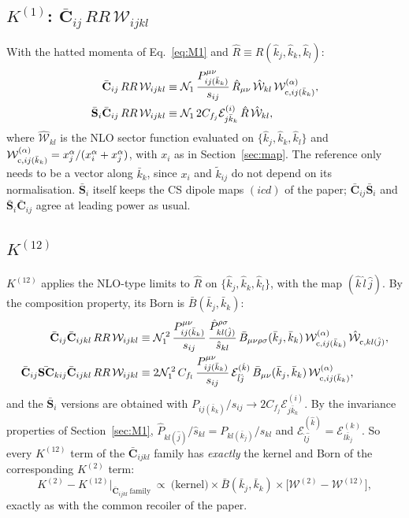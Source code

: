 \documentclass[11pt,a4paper]{article}
\newcommand{\bbC}[1]{\bar{\mathbf C}_{#1}}
\newcommand{\bbS}[1]{\bar{\mathbf S}_{#1}}
\newcommand{\bbSC}[1]{\bar{\mathbf{SC}}_{#1}}
\newcommand{\RR}{RR}
\newcommand{\W}[1]{\mathcal W_{#1}}
\newcommand{\jb}{\bar k_{j}}
\newcommand{\kb}{\bar k_{k}}
\newcommand{\jh}{\hat k_{j}}
\newcommand{\kh}{\hat k_{k}}
\newcommand{\lh}{\hat k_{l}}
\newcommand{\E}[3]{\mathcal E^{(#1)}_{#2#3}}
\newcommand{\Norms}{\mathcal N_1^{\,2}}
\begin{document}
\subsection{$K^{(1)}$: $\bbC{ij}\,\RR\,\W{ijkl}$}
With the hatted momenta of Eq.~\eqref{eq:M1} and $\hat R\equiv R(\jh,\kh,\lh)$:
\begin{align}
\bbC{ij}\,\RR\,\W{ijkl}&\equiv
\mathcal N_1\,\frac{P^{\mu\nu}_{ij(\kb)}}{s_{ij}}\,\hat R_{\mu\nu}\,
\hat{\mathcal W}_{kl}\,\W{{\rm c},ij(\kb)}^{(\alpha)},
\\
\bbS{i}\bbC{ij}\,\RR\,\W{ijkl}&\equiv \mathcal N_1\,2C_{f_j}\E{i}{j}{\kb}\,\hat R\,\hat{\mathcal W}_{kl},
\end{align}
where $\hat{\mathcal W}_{kl}$ is the NLO sector function evaluated on $\{\jh,\kh,\lh\}$ and
$\W{{\rm c},ij(\kb)}^{(\alpha)}=x_j^\alpha/(x_i^\alpha+x_j^\alpha)$, with $x_i$ as in Section~\ref{sec:map}.
The reference only needs to be a vector along $\kb$, since $x_i$ and $\tilde k_{ij}$ do not depend on its normalisation.
$\bbS{i}$ itself keeps the CS dipole maps $(icd)$ of the paper; $\bbC{ij}\bbS{i}$ and
$\bbS{i}\bbC{ij}$ agree at leading power as usual.

\subsection{$K^{(12)}$}
$K^{(12)}$ applies the NLO-type limits to $\hat R$ on $\{\jh,\kh,\lh\}$, with the map
$(\hat k\,\hat l\,\hat j)$. By the composition property, its Born is $\bar B(\jb,\kb)$:
\begin{align}
\bbC{ij}\bbC{ijkl}\,\RR\,\W{ijkl}
&\equiv\Norms\,\frac{P^{\mu\nu}_{ij(\kb)}}{s_{ij}}\,
\frac{\hat P^{\rho\sigma}_{kl(\hat j)}}{\hat s_{kl}}\,
\bar B_{\mu\nu\rho\sigma}(\jb,\kb)\,
\W{{\rm c},ij(\kb)}^{(\alpha)}\,\hat{\mathcal W}_{{\rm c},kl(\hat j)},\\
\bbC{ij}\bbSC{kij}\bbC{ijkl}\,\RR\,\W{ijkl}
&\equiv 2\Norms\,C_{f_l}\,\frac{P^{\mu\nu}_{ij(\kb)}}{s_{ij}}\,
\mathcal E^{(\hat k)}_{\hat l\hat j}\,\bar B_{\mu\nu}(\jb,\kb)\,
\W{{\rm c},ij(\kb)}^{(\alpha)},
\end{align}
and the $\bbS{i}$ versions are obtained with $P_{ij(\kb)}/s_{ij}\to2C_{f_j}\E{i}{j}{\kb}$.
By the invariance properties of Section~\ref{sec:M1}, $\hat P_{kl(\hat j)}/\hat s_{kl}=P_{kl(\jb)}/s_{kl}$ and
$\mathcal E^{(\hat k)}_{\hat l\hat j}=\E{k}{l}{\jb}$. So every $K^{(12)}$ term of the
$\bbC{ijkl}$ family has \emph{exactly} the kernel and Born of the corresponding $K^{(2)}$ term:
\begin{equation}
\boxed{\ K^{(2)}-K^{(12)}\big|_{\bbC{ijkl}\ \text{family}}\ \propto\
\text{(kernel)}\times\bar B(\jb,\kb)\times\big[\W{}^{(2)}-\W{}^{(12)}\big],\ }
\end{equation}
exactly as with the common recoiler of the paper.
\end{document}
